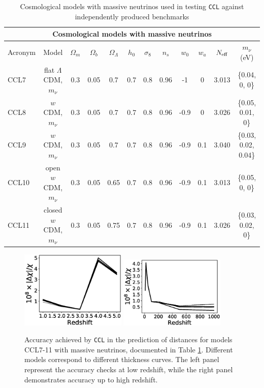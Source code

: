 \documentclass[\docopts]{\docclass}
\newcommand{\ccl}{{\tt CCL}\xspace}
\begin{document}
\begin{table}[t]
  \centering
  \begin{tabular}{ l c | c c c c c c c c c c }
    \hline
    \multicolumn{12}{|c|}{Cosmological models with massive neutrinos} \\
    \hline
    \hline
    Acronym & Model & $\Omega_m$ & $\Omega_b$ & $\Omega_\Lambda$ & $h_0$ & $\sigma_8$ & $n_s$ & $w_0$ & $w_a$ & $N_{\rm eff}$ & $m_\nu$ (eV) \\
    \hline
    CCL7 & flat $\Lambda$CDM, $m_\nu$ & 0.3 & 0.05 & 0.7 & 0.7 & 0.8 & 0.96 & -1 & 0 & 3.013 & \{0.04, 0, 0\} \\
    CCL8 & $w$CDM, $m_\nu$ & 0.3 & 0.05 & 0.7 & 0.7 & 0.8 & 0.96 & -0.9 & 0 & 3.026 & \{0.05, 0.01, 0\} \\
    CCL9 & $w$CDM, $m_\nu$ & 0.3 & 0.05 & 0.7 & 0.7 & 0.8 & 0.96 & -0.9 & 0.1 & 3.040 & \{0.03, 0.02, 0.04\} \\
    CCL10 & open $w$CDM, $m_\nu$ & 0.3 & 0.05 & 0.65 & 0.7 & 0.8 & 0.96 & -0.9 & 0.1 & 3.013 & \{0.05, 0, 0\}  \\
    CCL11 & closed $w$CDM, $m_\nu$ & 0.3 & 0.05 & 0.75 & 0.7 & 0.8 & 0.96 & -0.9 & 0.1 & 3.026 &\{0.03, 0.02, 0\} \\
    \hline
  \end{tabular}
  \caption{Cosmological models with massive neutrinos used in testing \ccl against independently produced benchmarks}
  \label{tab:cosmologies_nu}
\end{table}

\begin{figure}
  \centering
  \includegraphics[width=0.45\textwidth]{distances_mnu_low_z_class}
  \includegraphics[width=0.45\textwidth]{distances_mnu_high_z_class}
  \caption{Accuracy achieved by \ccl in the prediction of distances for models CCL7-11 with massive neutrinos, documented in Table \ref{tab:cosmologies_nu}. Different models correspond to different thickness curves. The left panel represent the accuracy checks at low redshift, while the right panel demonstrates accuracy up to high redshift.}
  \label{fig:distancegrow_nu}
\end{figure}
\end{document}
